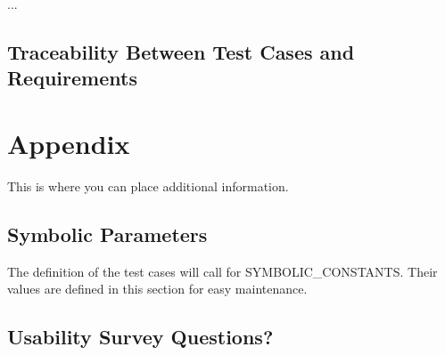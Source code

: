 \documentclass[12pt, titlepage]{article}
\begin{document}
...

\subsection{Traceability Between Test Cases and Requirements}

				




\newpage

\section{Appendix}

This is where you can place additional information.

\subsection{Symbolic Parameters}

The definition of the test cases will call for SYMBOLIC\_CONSTANTS.
Their values are defined in this section for easy maintenance.

\subsection{Usability Survey Questions?}

\end{document}
